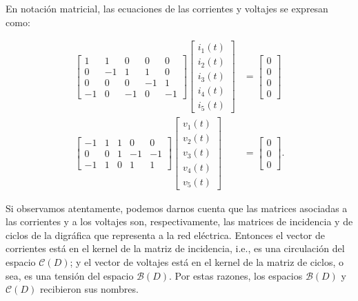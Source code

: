 En notación matricial, las ecuaciones de las corrientes y voltajes se expresan como:

\begin{align*}
\begin{bmatrix}
1 & 1 & 0 & 0 & 0\\ 
0 &-1  & 1 & 1 & 0\\ 
0 & 0 & 0 & -1 & 1\\ 
-1 & 0 & -1 & 0 & -1
\end{bmatrix} \begin{bmatrix}
i_{1}(t)\\ 
i_{2}(t)\\ 
i_{3}(t)\\ 
i_{4}(t)\\ 
i_{5}(t)
\end{bmatrix}&=\begin{bmatrix}
0\\ 
0\\ 
0\\ 
0
\end{bmatrix} \\
\begin{bmatrix}
-1 & 1 & 1 & 0 & 0\\ 
0 &0  & 1 & -1 & -1\\ 
-1 & 1 & 0 & 1 & 1
\end{bmatrix} \begin{bmatrix}
v_{1}(t)\\ 
v_{2}(t)\\ 
v_{3}(t)\\ 
v_{4}(t)\\ 
v_{5}(t)
\end{bmatrix}&=\begin{bmatrix}
0\\ 
0\\ 
0
\end{bmatrix}.    
\end{align*}

Si observamos atentamente, podemos darnos cuenta que las matrices asociadas a las corrientes y a los voltajes son, respectivamente, las matrices de incidencia y de ciclos de la digráfica que representa a la red eléctrica. Entonces el vector de corrientes está en el kernel de la matriz de incidencia, i.e., es una circulación del espacio $\mathcal{C}(D)$; y el vector de voltajes está en el kernel de la matriz de ciclos, o sea, es una tensión del espacio $\mathcal{B}(D)$. Por estas razones, los espacios $\mathcal{B}(D)$ y $\mathcal{C}(D)$ recibieron sus nombres.

